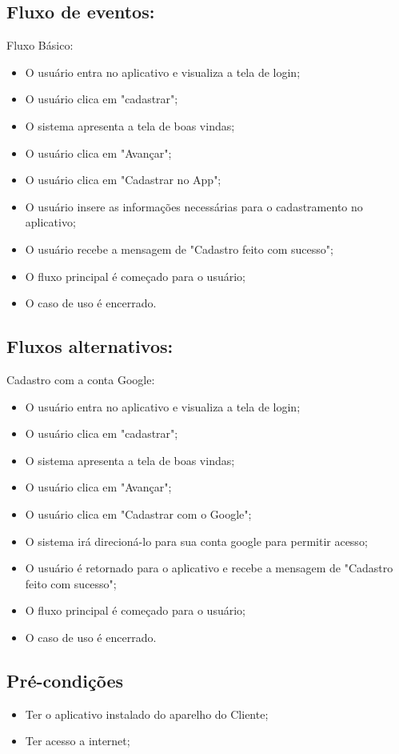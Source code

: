 \subsection{Fluxo de eventos:}
Fluxo Básico: 
\begin{itemize}
    \item O usuário entra no aplicativo e visualiza a tela de login;
    \item O usuário clica em "cadastrar";
    \item O sistema apresenta a tela de boas vindas;
    \item O usuário clica em "Avançar";
    \item O usuário clica em "Cadastrar no App";
    \item O usuário insere as informações necessárias para o cadastramento no aplicativo;
    \item O usuário recebe a mensagem de "Cadastro feito com sucesso";
    \item O fluxo principal é começado para o usuário;
    \item O caso de uso é encerrado.
\end{itemize}

\subsection{Fluxos alternativos:}
Cadastro com a conta Google:
\begin{itemize}
    \item O usuário entra no aplicativo e visualiza a tela de login;
    \item O usuário clica em "cadastrar";
    \item O sistema apresenta a tela de boas vindas;
    \item O usuário clica em "Avançar";
    \item O usuário clica em "Cadastrar com o Google";
    \item O sistema irá direcioná-lo para sua conta google para permitir acesso;
    \item O usuário é retornado para o aplicativo e recebe a mensagem de "Cadastro feito com sucesso";
    \item  O fluxo principal é começado para o usuário;
    \item O caso de uso é encerrado.
\end{itemize}
\subsection{Pré-condições}
\begin{itemize}
    \item Ter o aplicativo instalado do aparelho do Cliente;
    \item Ter acesso a internet;
\end{itemize}

